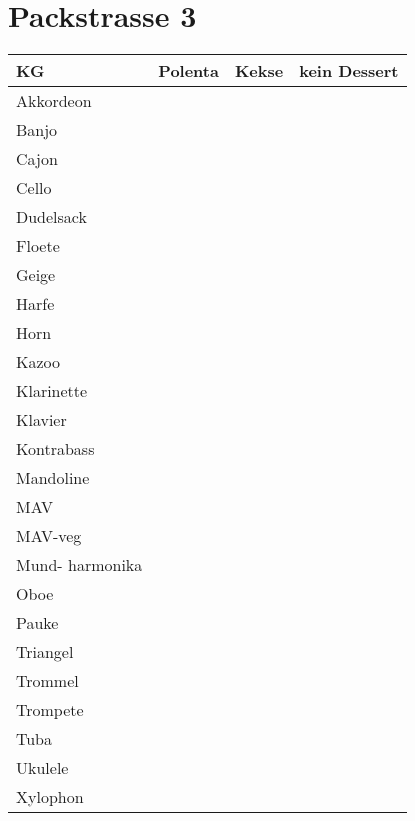 \documentclass[14pt]{article}
\begin{document}
\section{Packstrasse 3}

  \begin{tabular}{l|l|l|l}
    \toprule
    KG  &Polenta&Kekse&kein Dessert\\
    \midrule


Akkordeon&&&\\
\midrule

Banjo&&&\\
\midrule

Cajon&&&\\
\midrule

Cello&&&\\
\midrule

Dudelsack&&&\\
\midrule

Floete&&&\\
\midrule

Geige&&&\\
\midrule

Harfe&&&\\
\midrule

Horn&&&\\
\midrule

Kazoo&&&\\
\midrule

Klarinette&&&\\
\midrule

Klavier&&&\\
\midrule

Kontrabass&&&\\
\midrule

Mandoline&&&\\
\midrule
MAV&&&\\
\midrule
MAV-veg&&&\\
\midrule
Mund-
harmonika&&&\\
\midrule

Oboe&&&\\
\midrule

Pauke&&&\\
\midrule

Triangel&&&\\
\midrule

Trommel&&&\\
\midrule

Trompete&&&\\
\midrule

Tuba&&&\\
\midrule

Ukulele&&&\\
\midrule

    Xylophon&&&\\
    \bottomrule
\end{tabular}
\newpage
\end{document}
